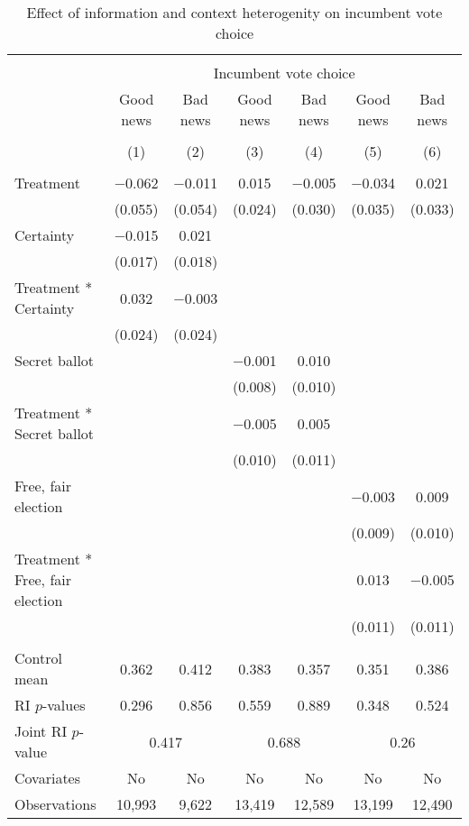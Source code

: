 \documentclass[]{article}
\begin{document}
\begin{table}[!htbp] \centering 
  \caption{Effect of information and context heterogenity on incumbent vote choice} 
  \label{context_hetero} 
\begin{tabular}{@{\extracolsep{1pt}}lcccccc} 
\\[-1.8ex]\hline 
\hline \\[-1.8ex] 
 & \multicolumn{6}{c}{Incumbent vote choice} \\ 
\cline{2-7} 
 & Good news & Bad news & Good news & Bad news & Good news & Bad news \\ 
\cline{2-7}
\\[-1.8ex] & (1) & (2) & (3) & (4) & (5) & (6)\\ 
\hline \\[-1.8ex] 
 Treatment & $-$0.062 & $-$0.011 & 0.015 & $-$0.005 & $-$0.034 & 0.021 \\ 
  & (0.055) & (0.054) & (0.024) & (0.030) & (0.035) & (0.033) \\ 
  Certainty & $-$0.015 & 0.021 &  &  &  &  \\ 
  & (0.017) & (0.018) &  &  &  &  \\ 
  Treatment * Certainty & 0.032 & $-$0.003 &  &  &  &  \\ 
  & (0.024) & (0.024) &  &  &  &  \\ 
  Secret ballot &  &  & $-$0.001 & 0.010 &  &  \\ 
  &  &  & (0.008) & (0.010) &  &  \\ 
  Treatment * Secret ballot &  &  & $-$0.005 & 0.005 &  &  \\ 
  &  &  & (0.010) & (0.011) &  &  \\ 
  Free, fair election &  &  &  &  & $-$0.003 & 0.009 \\ 
  &  &  &  &  & (0.009) & (0.010) \\ 
  Treatment * Free, fair election &  &  &  &  & 0.013 & $-$0.005 \\ 
  &  &  &  &  & (0.011) & (0.011) \\ 
 \hline \\[-1.8ex] 
Control mean & 0.362 & 0.412 & 0.383 & 0.357 & 0.351 & 0.386 \\ 
RI $p$-values & 0.296 & 0.856 & 0.559 & 0.889 & 0.348 & 0.524 \\ 
Joint RI $p$-value & \multicolumn{2}{c}{0.417} & \multicolumn{2}{c}{0.688} & \multicolumn{2}{c}{0.26}\\
Covariates & No & No & No & No & No & No \\ 
Observations & 10,993 & 9,622 & 13,419 & 12,589 & 13,199 & 12,490 \\ 

\end{tabular}
\end{table}
\end{document}
